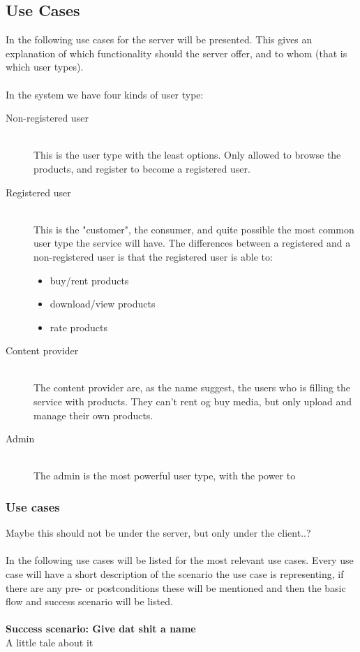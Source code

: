 \subsection{Use Cases}
In the following use cases for the server will be presented. This gives an explanation of which functionality should the server offer, and to whom (that is which user types).
\\ \\
In the system we have four kinds of user type:
\begin{description}
	\item [Non-registered user] \hfill \\
		This is the user type with the least options. Only allowed to browse the products, and register to become a registered user.
	\item [Registered user]  \hfill \\
		This is the "customer", the consumer, and quite possible the most common user type the service will have. The differences between a registered and a non-registered user is that the registered user is able to:
		\begin{itemize}
			\item buy/rent products
			\item download/view products
			\item rate products
		\end{itemize}
	\item [Content provider] \hfill \\
		The content provider are, as the name suggest, the users who is filling the service with products. They can't rent og buy media, but only upload and manage their own products.
	\item [Admin] \hfill \\
		The admin is the most powerful user type, with the power to 
\end{description}

\subsubsection{Use cases}

Maybe this should not be under the server, but only under the client..?\\\\
In the following use cases will be listed for the most relevant use cases. Every use case will have a short description of the scenario the use case is representing, if there are any pre- or postconditions these will be mentioned and then the basic flow and success scenario will be listed.
\\\\
\textbf{Success scenario: Give dat shit a name} \\
A little tale about it

